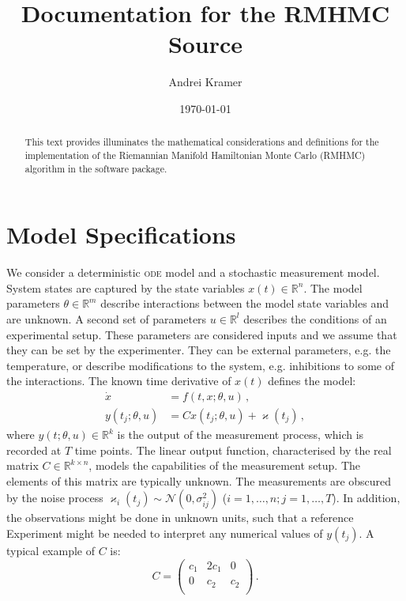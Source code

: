 \documentclass[utf8,english]{scrartcl}
\title{Documentation for the RMHMC Source}
\author{Andrei Kramer}
\date{\today}
\newcommand{\noise}{\ensuremath{\varkappa}}
\newcommand{\ode}{\textsc{ode}}
\begin{document}
\maketitle
\begin{abstract}
  This text provides illuminates the mathematical considerations and
  definitions for the implementation of the Riemannian Manifold
  Hamiltonian Monte Carlo (RMHMC) algorithm in the software package.
\end{abstract}

\section{Model Specifications}
\label{sec:odeModel}

We consider a deterministic \ode{} model and a stochastic measurement
model. System states are captured by the state variables
$x(t)\in\mathbb{R}^n$. The model parameters $\theta\in\mathbb{R}^m$
describe interactions between the model state variables and are
unknown. A second set of parameters $u\in\mathbb{R}^l$ describes the
conditions of an experimental setup. These parameters are considered
inputs and we assume that they can be set by the experimenter. They
can be external parameters, e.g. the temperature, or describe
modifications to the system, e.g. inhibitions to some of the
interactions. The known time derivative of $x(t)$ defines the model:
\begin{align}
  \dot x &= f(t,x;\theta,u)\,,\\
  y(t_j;\theta,u)&=C x(t_j;\theta,u) + \noise(t_j)\,,
\end{align}
where $y(t;\theta,u)\in\mathbb{R}^k$ is the output of the measurement
process, which is recorded at $T$ time points. The linear output
function, characterised by the real matrix $C\in\mathbb{R}^{k\times
  n}$, models the capabilities of the measurement setup. The elements
of this matrix are typically unknown. The measurements are obscured by
the noise process $\noise_i(t_j)\sim\mathcal{N}(0,\sigma^2_{ij})$
($i=1,\dots,n; j=1,\dots,T$). In addition, the observations might be
done in unknown units, such that a reference Experiment might be
needed to interpret any numerical values of $y(t_j)$. A typical
example of $C$ is:
\begin{equation}
  C=
  \begin{pmatrix}
    c_1&2c_1&0\\
    0&c_2&c_2\\
  \end{pmatrix}\,.
\end{equation}
\end{document}
